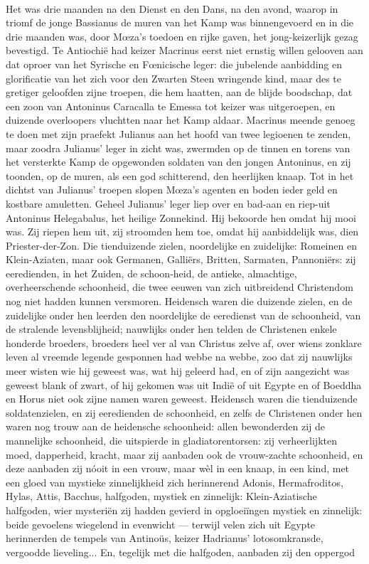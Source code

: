 \documentclass[a4paper, 12pt, oneside, dutch]{article}
\begin{document}
\paragraph{}
Het was drie maanden na den Dienst en den Dans, na den avond, waarop in triomf de jonge Bassianus de muren van het Kamp was binnengevoerd en in die drie maanden was, door Mœza's toedoen en rijke gaven, het jong-keizerlijk gezag bevestigd. Te Antiochië had keizer Macrinus eerst niet ernstig willen gelooven aan dat oproer van het Syrische en Fœnicische leger: die jubelende aanbidding en glorificatie van het zich voor den Zwarten Steen wringende kind, maar des te gretiger geloofden zijne troepen, die hem haatten, aan de blijde boodschap, dat een zoon van Antoninus Caracalla te Emessa tot keizer was uitgeroepen, en duizende overloopers vluchtten naar het Kamp aldaar. Macrinus meende genoeg te doen met zijn praefekt Julianus aan het hoofd van twee legioenen te zenden, maar zoodra Julianus' leger in zicht was, zwermden op de tinnen en torens van het versterkte Kamp de opgewonden soldaten van den jongen Antoninus, en zij toonden, op de muren, als een god schitterend, den heerlijken knaap. Tot in het dichtst van Julianus' troepen slopen Mœza's agenten en boden ieder geld en kostbare amuletten. Geheel Julianus' leger liep over en bad-aan en riep-uit Antoninus Helegabalus, het heilige Zonnekind. Hij bekoorde hen omdat hij mooi was. Zij riepen hem uit, zij stroomden hem toe, omdat hij aanbiddelijk was, dien Priester-der-Zon. Die tienduizende zielen, noordelijke en zuidelijke: Romeinen en Klein-Aziaten, maar ook Germanen, Galliërs, Britten, Sarmaten, Pannoniërs: zij eeredienden, in het Zuiden, de schoon-heid, de antieke, almachtige, overheerschende schoonheid, die twee eeuwen van zich uitbreidend Christendom nog niet hadden kunnen versmoren. Heidensch waren die duizende zielen, en de zuidelijke onder hen leerden den noordelijke de eeredienst van de schoonheid, van de stralende levensblijheid; nauwlijks onder hen telden de Christenen enkele honderde broeders, broeders heel ver al van Christus zelve af, over wiens zonklare leven al vreemde legende gesponnen had webbe na webbe, zoo dat zij nauwlijks meer wisten wie hij geweest was, wat hij geleerd had, en of zijn aangezicht was geweest blank of zwart, of hij gekomen was uit Indië of uit Egypte en of Boeddha en Horus niet ook zijne namen waren geweest. Heidensch waren die tienduizende soldatenzielen, en zij eeredienden de schoonheid, en zelfs de Christenen onder hen waren nog trouw aan de heidensche schoonheid: allen bewonderden zij de mannelijke schoonheid, die uitspierde in gladiatorentorsen: zij verheerlijkten moed, dapperheid, kracht, maar zij aanbaden ook de vrouw-zachte schoonheid, en deze aanbaden zij nóoit in een vrouw, maar wèl in een knaap, in een kind, met een gloed van mystieke zinnelijkheid zich herinnerend Adonis, Hermafroditos, Hylas, Attis, Bacchus, halfgoden, mystiek en zinnelijk: Klein-Aziatische halfgoden, wier mysteriën zij hadden gevierd in opgloeiïngen mystiek en zinnelijk: beide gevoelens wiegelend in evenwicht --- terwijl velen zich uit Egypte herinnerden de tempels van Antinoüs, keizer Hadrianus' lotosomkransde, vergoodde lieveling... En, tegelijk met die halfgoden, aanbaden zij den oppergod 
\end{document}
